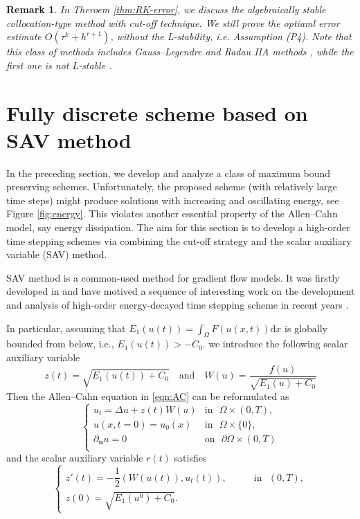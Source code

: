 \documentclass[10pt,final,leqno,onefignum,onetabnum]{siamltex}%
\newtheorem{remark}{Remark}[section]
\def\d{\textrm{d}}
\def\d{\mathrm{d}}
\begin{document}
\begin{remark}\label{rem:RK}
In Theroem \ref{thm:RK-error}, we discuss the algebraically stable collocation-type method with cut-off technique.
We still prove the optiaml error estimate $O(\tau^k + h^{r+1})$, without the L-stability, i.e. Assumption (P4).
Note that this class of methods includes Gauss--Legendre and Radau IIA methods \cite[Theorem 12.9]{HairerWanner:2010},
while the first one is not L-stable \cite[Table 5.13]{HairerWanner:2010}.
\end{remark}




\section{Fully discrete scheme based on SAV method}\label{sec:sav}
In the preceding section, we develop and analyze a class of maximum bound preserving schemes.
Unfortunately,  the proposed scheme (with relatively large time steps) might produce solutions
with increasing and oscillating energy, see Figure \ref{fig:energy}.
This violates another essential property of the Allen--Cahn model, say energy dissipation.
The aim for this section is to develop
a high-order time stepping schemes via combining the cut-off strategy and
the scalar auxiliary variable (SAV) method.

SAV method is a common-used method for  gradient flow models. It was firstly developed in
\cite{shen2018scalar,shen2019new} and have motived a sequence of interesting work on the
development and analysis of high-order energy-decayed time stepping scheme
in recent years \cite{akrivis2019energy,ShenXu:2018,Gong:2020}.

In particular, assuming that $E_1(u(t)) = \int_{\Omega}F(u(x,t))\d x$  is globally bounded from below,
i.e., $E_1(u(t)) > -C_0$.
we introduce the following scalar auxiliary variable \cite{shen2018scalar}
\begin{equation}\label{eq:scalar}
 z(t) = \sqrt{E_1(u(t)) + C_0}\quad \text{and} \quad W(u) = \dfrac{f(u)}{\sqrt{E_1(u) + C_0}}
\end{equation}
Then the Allen--Cahn equation in \eqref{eqn:AC} can be reformulated as
\begin{equation}\label{eqn:AC-sav}
    \begin{cases}
    u_t = \Delta u + z(t) W(u) &
        \mbox{in~~} \Omega\times(0,T),\\
    u(x,t=0) = u_0(x)   &
        \mbox{in~~} \Omega\times\{0\},\\
    \partial_{\mathbf{n}}u = 0  &
        \mbox{on~~} \partial\Omega\times(0,T)\\
  \end{cases}
\end{equation}
and the scalar auxiliary variable $r(t)$ satisfies
\begin{equation}\label{eqn:r}
\begin{cases}
    z'(t) = -\dfrac12(W(u(t)), u_t(t)),&\qquad \mbox{in~~} (0,T),\\
   z(0) = \sqrt{E_1(u^0) + C_0}.&
 \end{cases}
\end{equation}
\end{document}
